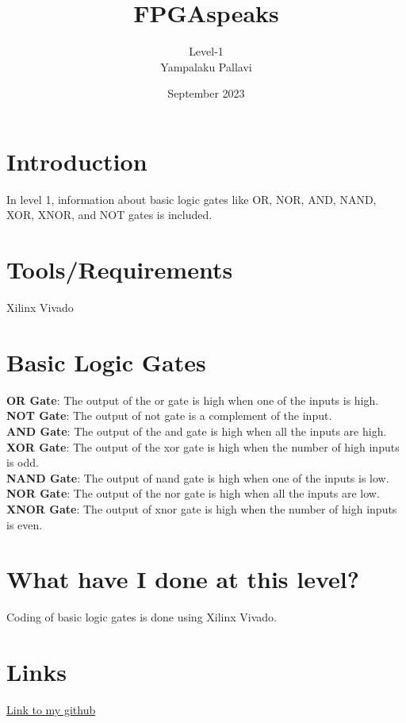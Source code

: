 \documentclass{article}
\title{\textbf{FPGAspeaks}}
\author{Level-1\\Yampalaku Pallavi}
\date{September 2023}
\begin{document}
\maketitle
\tableofcontents
\section{Introduction}
In level 1, information about basic logic gates like OR, NOR, AND, NAND, XOR, XNOR, and NOT gates is included.
\section{Tools/Requirements}
Xilinx Vivado
\section{Basic Logic Gates}
\textbf{OR Gate}: The output of the or gate is high when one of the inputs is high.\\
\textbf{NOT Gate}: The output of not gate is a complement of the input.\\
\textbf{AND Gate}: The output of the and gate is high when all the inputs are high.\\
\textbf{XOR Gate}: The output of the xor gate is high  when the number of high inputs is odd.\\
\textbf{NAND Gate}: The output of nand gate is high when one of the inputs is low.\\
\textbf{NOR Gate}: The output of the nor gate is high when all the inputs are low.\\
\textbf{XNOR Gate}: The output of xnor gate is high when the number of high inputs is even.

\section{What have I done at this level?}
Coding of basic logic gates is done using Xilinx Vivado.
\section{Links}
\href{https://github.com/pallavi2564/FPGAspeaks}{Link to my github}
\end{document}
